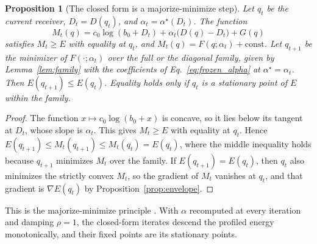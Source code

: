 \documentclass[11pt]{article}
\newtheorem{proposition}{Proposition}
\theoremstyle{definition}
\theoremstyle{remark}
\begin{document}
\begin{proposition}[The closed form is a majorize-minimize step]
\label{prop:mm}
Let $q_t$ be the current receiver, $D_t=D(q_t)$, and $\alpha_t=\alpha^\star(D_t)$. The function
\begin{equation}
M_t(q)=c_0\log(b_0+D_t)+\alpha_t\bigl(D(q)-D_t\bigr)+G(q)
\end{equation}
satisfies $M_t\ge E$ with equality at $q_t$, and $M_t(q)=F(q;\alpha_t)+\text{const}$. Let $q_{t+1}$ be the minimizer of $F(\cdot;\alpha_t)$ over the full or the diagonal family, given by Lemma~\ref{lem:family} with the coefficients of Eq.~\eqref{eq:frozen_alpha} at $\alpha^\star=\alpha_t$. Then $E(q_{t+1})\le E(q_t)$. Equality holds only if $q_t$ is a stationary point of $E$ within the family.
\end{proposition}

\begin{proof}
The function $x\mapsto c_0\log(b_0+x)$ is concave, so it lies below its tangent at $D_t$, whose slope is $\alpha_t$. This gives $M_t\ge E$ with equality at $q_t$. Hence $E(q_{t+1})\le M_t(q_{t+1})\le M_t(q_t)=E(q_t)$, where the middle inequality holds because $q_{t+1}$ minimizes $M_t$ over the family. If $E(q_{t+1})=E(q_t)$, then $q_t$ also minimizes the strictly convex $M_t$, so the gradient of $M_t$ vanishes at $q_t$, and that gradient is $\nabla E(q_t)$ by Proposition~\ref{prop:envelope}.
\end{proof}

This is the majorize-minimize principle \citep{hunter2004mm}. With $\alpha$ recomputed at every iteration and damping $\rho=1$, the closed-form iterates descend the profiled energy monotonically, and their fixed points are its stationary points.
\end{document}
